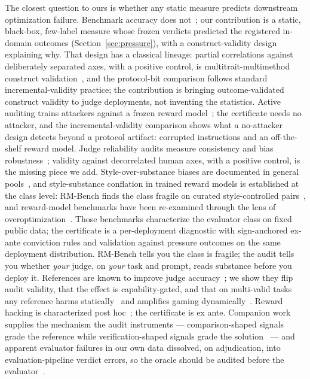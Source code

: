\documentclass[11pt]{article}
\begin{document}
The closest question to ours is whether any static measure predicts downstream optimization failure.
Benchmark accuracy does not~\cite{wen2024rethinking}; our contribution is a static, black-box, few-label measure whose frozen verdicts predicted the registered in-domain outcomes (Section~\ref{sec:pressure}), with a construct-validity design explaining why.
That design has a classical lineage: partial correlations against deliberately separated axes, with a positive control, is multitrait-multimethod construct validation~\cite{campbellfiske1959}, and the protocol-bit comparison follows standard incremental-validity practice; the contribution is bringing outcome-validated construct validity to judge deployments, not inventing the statistics.
Active auditing trains attackers against a frozen reward model~\cite{beigi2026ara}; the certificate needs no attacker, and the incremental-validity comparison shows what a no-attacker design detects beyond a protocol artifact: corrupted instructions and an off-the-shelf reward model.
Judge reliability audits measure consistency and bias robustness~\cite{judgechanges2026,zheng2023judging}; validity against decorrelated human axes, with a positive control, is the missing piece we add.
Style-over-substance biases are documented in general pools~\cite{wu2023style,dubois2024length,singhal2023long}, and style-substance conflation in trained reward models is established at the class level: RM-Bench finds the class fragile on curated style-controlled pairs~\cite{rmbench2024}, and reward-model benchmarks have been re-examined through the lens of overoptimization~\cite{kim2025lens}.
Those benchmarks characterize the evaluator class on fixed public data; the certificate is a per-deployment diagnostic with sign-anchored ex-ante conviction rules and validation against pressure outcomes on the same deployment distribution.
RM-Bench tells you the class is fragile; the audit tells you whether \emph{your} judge, on \emph{your} task and prompt, reads substance before you deploy it.
References are known to improve judge accuracy~\cite{refguided2024,smalljudges2025}; we show they flip audit validity, that the effect is capability-gated, and that on multi-valid tasks any reference harms statically~\cite{generous2026,dobefore2025} and amplifies gaming dynamically~\cite{companionD}.
Reward hacking is characterized post hoc~\cite{gao2022scaling,skalse2022defining,coste2023ensembles,eisenstein2023helping,selfplay2026}; the certificate is ex ante.
Companion work supplies the mechanism the audit instruments --- comparison-shaped signals grade the reference while verification-shaped signals grade the solution~\cite{companionB} --- and apparent evaluator failures in our own data dissolved, on adjudication, into evaluation-pipeline verdict errors, so the oracle should be audited before the evaluator~\cite{companionC}.
\end{document}
